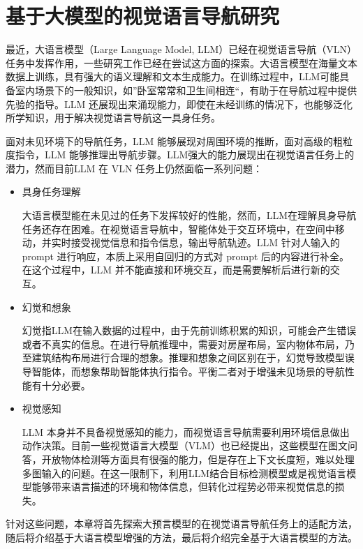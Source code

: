 \documentclass[bachelor]{thesis-uestc}
\begin{document}
\chapter{基于大模型的视觉语言导航研究}

最近，大语言模型（Large Language Model, LLM）已经在视觉语言导航（VLN）任务中发挥作用，一些研究工作已经在尝试这方面的探索。大语言模型在海量文本数据上训练，具有强大的语义理解和文本生成能力。在训练过程中，LLM可能具备室内场景下的一般知识，如”卧室常常和卫生间相连“，有助于在导航过程中提供先验的指导。LLM 还展现出来涌现能力，即使在未经训练的情况下，也能够泛化所学知识，用于解决视觉语言导航这一具身任务。

面对未见环境下的导航任务，LLM 能够展现对周围环境的推断，面对高级的粗粒度指令，LLM 能够推理出导航步骤。LLM强大的能力展现出在视觉语言任务上的潜力，然而目前LLM 在 VLN 任务上仍然面临一系列问题：

\begin{itemize}
    \item 具身任务理解
    
    大语言模型能在未见过的任务下发挥较好的性能，然而，LLM在理解具身导航任务还存在困难。在视觉语言导航中，智能体处于交互环境中，在空间中移动，并实时接受视觉信息和指令信息，输出导航轨迹。LLM 针对人输入的 prompt 进行响应，本质上采用自回归的方式对 prompt 后的内容进行补全。在这个过程中，LLM 并不能直接和环境交互，而是需要解析后进行新的交互。

    \item 幻觉和想象
    
    幻觉指LLM在输入数据的过程中，由于先前训练积累的知识，可能会产生错误或者不真实的信息。在进行导航推理中，需要对房屋布局，室内物体布局，乃至建筑结构布局进行合理的想象。推理和想象之间区别在于，幻觉导致模型误导智能体，而想象帮助智能体执行指令。平衡二者对于增强未见场景的导航性能有十分必要。

    \item 视觉感知
    
    LLM 本身并不具备视觉感知的能力，而视觉语言导航需要利用环境信息做出动作决策。目前一些视觉语言大模型（VLM）也已经提出，这些模型在图文问答，开放物体检测等方面具有很强的能力，但是存在上下文长度短，难以处理多图输入的问题。在这一限制下，利用LLM结合目标检测模型或是视觉语言模型能够带来语言描述的环境和物体信息，但转化过程势必带来视觉信息的损失。
\end{itemize}

针对这些问题，本章将首先探索大预言模型的在视觉语言导航任务上的适配方法，随后将介绍基于大语言模型增强的方法，最后将介绍完全基于大语言模型的方法。
\end{document}
